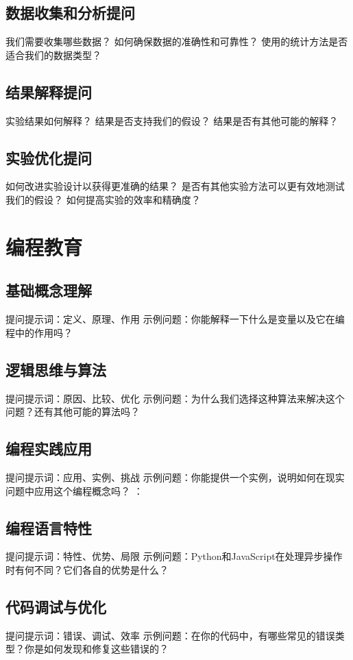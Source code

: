 \documentclass[12pt]{book}
\begin{document}
\subsection{数据收集和分析提问}
我们需要收集哪些数据？
如何确保数据的准确性和可靠性？
使用的统计方法是否适合我们的数据类型？

\subsection{结果解释提问}
实验结果如何解释？
结果是否支持我们的假设？
结果是否有其他可能的解释？

\subsection{实验优化提问}
如何改进实验设计以获得更准确的结果？
是否有其他实验方法可以更有效地测试我们的假设？
如何提高实验的效率和精确度？


\section{编程教育}
\subsection{基础概念理解}
提问提示词：定义、原理、作用
示例问题：你能解释一下什么是变量以及它在编程中的作用吗？

\subsection{逻辑思维与算法}
提问提示词：原因、比较、优化
示例问题：为什么我们选择这种算法来解决这个问题？还有其他可能的算法吗？

\subsection{编程实践应用}
提问提示词：应用、实例、挑战
示例问题：你能提供一个实例，说明如何在现实问题中应用这个编程概念吗？
：
\subsection{编程语言特性}
提问提示词：特性、优势、局限
示例问题：Python和JavaScript在处理异步操作时有何不同？它们各自的优势是什么？

\subsection{代码调试与优化}
提问提示词：错误、调试、效率
示例问题：在你的代码中，有哪些常见的错误类型？你是如何发现和修复这些错误的？
\end{document}
